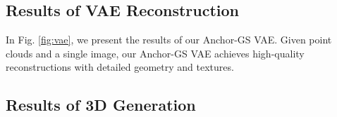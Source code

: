 





\subsection{Results of VAE Reconstruction}
In Fig. \ref{fig:vae}, we present the results of our Anchor-GS VAE. Given point clouds and a single image, our Anchor-GS VAE achieves high-quality reconstructions with detailed geometry and textures.



\subsection{Results of 3D Generation }
\label{sec:comparison}
